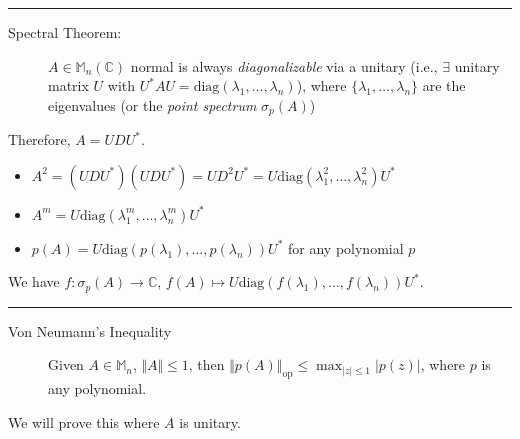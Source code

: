 \documentclass[8pt]{extarticle}
\newcommand{\C}{\mathbb{C}}
\begin{document}
  \rule{\textwidth}{0.4pt}
  \begin{description}
    \item[Spectral Theorem:] $A\in \mathbb{M}_n(\C)$ normal is always \textit{diagonalizable} via a unitary (i.e., $\exists$ unitary matrix $U$ with $U^* A U = \text{diag}(\lambda_1,\dots,\lambda_n)$), where $\{\lambda_1,\dots,\lambda_n\}$ are the eigenvalues (or the \textit{point spectrum} $\sigma_p(A)$)
  \end{description}
  Therefore, $A = UDU^*$.
  \begin{itemize}
    \item $A^2 = (UDU^*)(UDU^*) = UD^2U^* = U\text{diag}(\lambda_1^2,\dots,\lambda_n^2)U^*$
    \item $A^m = U\text{diag}(\lambda_1^m,\dots,\lambda_n^m)U^*$
    \item $p(A) = U\text{diag}(p(\lambda_1),\dots,p(\lambda_n))U^*$ for any polynomial $p$
  \end{itemize}
  We have $f: \sigma_p(A) \rightarrow \C$, $f(A) \mapsto U\text{diag}(f(\lambda_1),\dots,f(\lambda_n))U^*$.\\
  \rule{\textwidth}{0.4pt}
  \begin{description}
    \item[Von Neumann's Inequality] Given $A\in \mathbb{M}_n$, $\Vert A \Vert \leq 1$, then $\Vert p(A)\Vert_{\text{op}} \leq \max_{|z|\leq 1}|p(z)|$, where $p$ is any polynomial.
  \end{description}
  We will prove this where $A$ is unitary.
\end{document}
